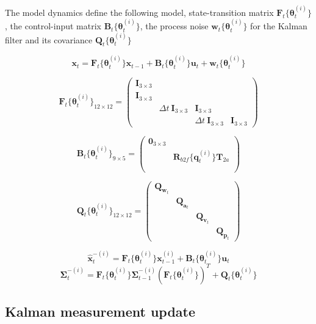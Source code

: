 \documentclass[]{article}
\begin{document}
The model dynamics define the following model, state-transition matrix
\(\mathbf{F}_t\{\boldsymbol{\theta}^{(i)}_t\}\), the control-input
matrix \(\mathbf{B}_t\{\boldsymbol{\theta}^{(i)}_t\}\), the process
noise \(\mathbf{w}_t\{\boldsymbol{\theta}^{(i)}_t\}\) for the Kalman
filter and its covariance
\(\mathbf{Q}_t\{\boldsymbol{\theta}^{(i)}_t\}\)

\[\mathbf{x}_t = \mathbf{F}_t\{\boldsymbol{\theta}^{(i)}_t\} \mathbf{x}_{t-1} + \mathbf{B}_t\{\boldsymbol{\theta}^{(i)}_t\} \mathbf{u}_t + \mathbf{w}_t\{\boldsymbol{\theta}^{(i)}_t\}\]

\[\mathbf{F}_t\{\boldsymbol{\theta}^{(i)}_t\}_{12 \times 12} = 
\left( \begin{array}{cccc}
\mathbf{I}_{3 \times 3} & & & \\
\mathbf{I}_{3 \times 3} & & & \\
& \Delta t~\mathbf{I}_{3 \times 3} & \mathbf{I}_{3 \times 3} & \\
& & \Delta t~\mathbf{I}_{3 \times 3} & \mathbf{I}_{3 \times 3}
\end{array} \right)\]

\[\mathbf{B}_t\{\boldsymbol{\theta}^{(i)}_t\}_{9 \times 5} = 
\left( \begin{array}{ccc}
\mathbf{0}_{3 \times 3} & \\
& \mathbf{R}_{b2f}\{\mathbf{q}^{(i)}_{t}\}\mathbf{T}_{2a} \\
& \\
&
\end{array} \right)\]

\[\mathbf{Q}_t\{\boldsymbol{\theta}^{(i)}_t\}_{12 \times 12} = 
\left( \begin{array}{cccc}
\mathbf{Q}_{\mathbf{w}_t } & & &\\
& \mathbf{Q}_{\mathbf{a}_t } & &\\
& & \mathbf{Q}_{\mathbf{v}_t }& \\
& & &\mathbf{Q}_{\mathbf{p}_t }
\end{array} \right)\]

\[\hat{\mathbf{x}}^{-(i)}_t = \mathbf{F}_t\{\boldsymbol{\theta}^{(i)}_t\} \mathbf{x}^{(i)}_{t-1} + \mathbf{B}_t\{\boldsymbol{\theta}^{(i)}_t\} \mathbf{u}_t \]
\[ \mathbf{\Sigma}^{-(i)}_t = \mathbf{F}_t\{\boldsymbol{\theta}^{(i)}_t\} \mathbf{\Sigma}^{-(i)}_{t-1}  (\mathbf{F}_t\{\boldsymbol{\theta}^{(i)}_t\})^T + \mathbf{Q}_t\{\boldsymbol{\theta}^{(i)}_t\}\]

\subsection{Kalman measurement update}\label{kalman-measurement-update}
\end{document}
